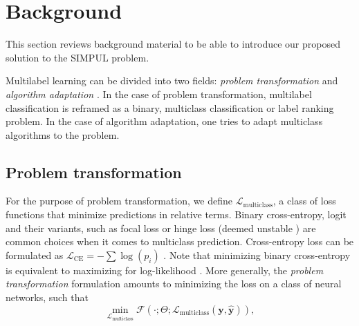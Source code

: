
\section{Background}
\label{sec:org8c910ea}


This section reviews background material to be able to introduce our proposed solution to the SIMPUL problem.

Multilabel learning can be divided into two fields: \emph{problem transformation} and \emph{algorithm adaptation} \cite{multilabelReview}. In the case of problem transformation, multilabel classification is reframed as a binary, multiclass classification or label ranking problem. In the case of algorithm adaptation, one tries to adapt multiclass algorithms to the problem. 

\subsection{Problem transformation}
For the purpose of problem transformation, we define \(\mathcal{L}_{\text {multiclass}}\), a class of loss functions that minimize predictions in relative terms. Binary cross-entropy, logit and their variants, such as focal loss or hinge loss (deemed unstable \cite{focalLoss} ) are common choices when it comes to multiclass prediction. Cross-entropy loss can be formulated as \(\mathcal{L}_{\text {CE}}=-\sum \log \left(p_{i}\right)\) . Note that minimizing binary cross-entropy is equivalent to maximizing for log-likelihood \cite[Section 4.3.4]{Bishop}. More generally, the \emph{problem transformation} formulation amounts to minimizing the loss on a class of neural networks, such that
%
\begin{equation}
\underset{\mathcal{L}_{\text {multiclass}}} {\min} \mathcal{F}\left(\cdot ; \Theta; \mathcal{L}_{\text {multiclass}} (\mathbf{y}, \hat{\mathbf{y}}) \right),
\end{equation}
%


